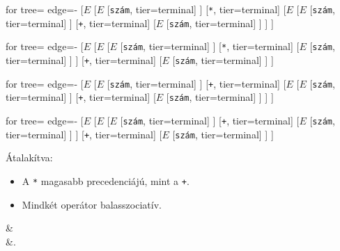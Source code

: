 \begin{enumerate}
\begin{itemize}
		\begin{minipage}{0.5\linewidth}
			\begin{forest}
				for tree={ edge={-}}
				[$E$
					[$E$
						[\texttt{szám}, tier=terminal]
					]
					[\texttt{*}, tier=terminal]
					[$E$
						[$E$
							[\texttt{szám}, tier=terminal]
						]
							[\texttt{+}, tier=terminal]
						[$E$
							[\texttt{szám}, tier=terminal]
						]
					]
				]
			\end{forest}
		\end{minipage}
		\begin{minipage}{0.5\linewidth}
			\begin{forest}
				for tree={ edge={-}}
				[$E$
				[$E$
				[$E$
				[\texttt{szám}, tier=terminal]
				]
				[\texttt{*}, tier=terminal]
				[$E$
				[\texttt{szám}, tier=terminal]
				]
				]
				[\texttt{+}, tier=terminal]
				[$E$
				[\texttt{szám}, tier=terminal]
				]
				]
			\end{forest}
		\end{minipage}
	
		\begin{minipage}{0.5\linewidth}
			\begin{forest}
				for tree={ edge={-}}
				[$E$
				[$E$
				[\texttt{szám}, tier=terminal]
				]
				[\texttt{+}, tier=terminal]
				[$E$
				[$E$
				[\texttt{szám}, tier=terminal]
				]
				[\texttt{+}, tier=terminal]
				[$E$
				[\texttt{szám}, tier=terminal]
				]
				]
				]
			\end{forest}
		\end{minipage}
		\begin{minipage}{0.5\linewidth}
			\begin{forest}
				for tree={ edge={-}}
				[$E$
				[$E$
				[$E$
				[\texttt{szám}, tier=terminal]
				]
				[\texttt{+}, tier=terminal]
				[$E$
				[\texttt{szám}, tier=terminal]
				]
				]
				[\texttt{+}, tier=terminal]
				[$E$
				[\texttt{szám}, tier=terminal]
				]
				]
			\end{forest}
		\end{minipage}
		
		Átalakítva:
		\begin{itemize}
			\item A \texttt{*} magasabb precedenciájú, mint a \texttt{+}.
			\item Mindkét operátor balasszociatív.
		\end{itemize}
		\begin{flalign*}
			& \\
			&.
		\end{flalign*}
	
	\end{itemize}
\end{enumerate}

